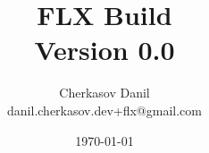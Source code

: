 \documentclass{memoir}
\begin{document}
	
	\title{\textbf{FLX Build} \\[0.3cm] \large Version 0.0}
	\author{Cherkasov Danil \\ danil.cherkasov.dev+flx@gmail.com}
	\date{\today}
	
	\maketitle
	\thispagestyle{empty}
	
	\newpage
	\thispagestyle{empty}
	\tableofcontents
	
	\pagestyle{fancy}
	
	
	
\end{document}
